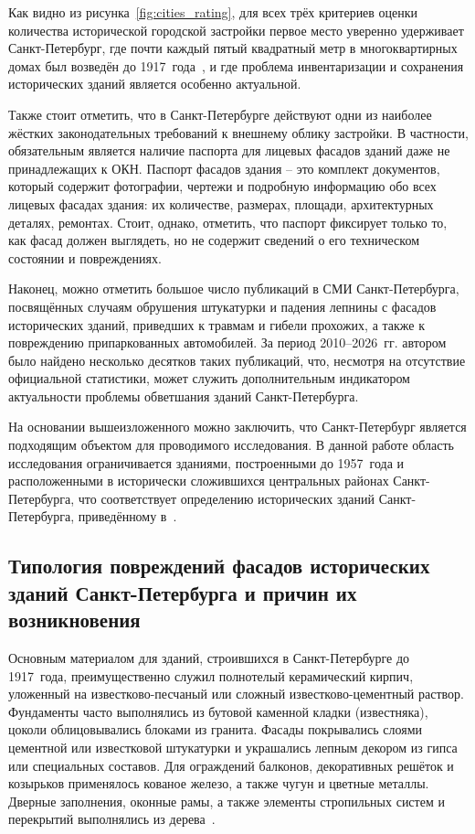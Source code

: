 \documentclass[14pt]{extarticle}
\begin{document}
Как видно из рисунка~\ref{fig:cities_rating}, для всех трёх критериев оценки
количества исторической городской застройки первое место уверенно удерживает
Санкт-Петербург, где почти каждый пятый квадратный метр в многоквартирных домах
был возведён до 1917~года~\cite{kontikimaps}, и где проблема инвентаризации и
сохранения исторических зданий является особенно актуальной.

Также стоит отметить, что в Санкт-Петербурге действуют одни из наиболее жёстких
законодательных требований к внешнему облику застройки. В
частности, обязательным является наличие паспорта для лицевых фасадов зданий
даже не принадлежащих к ОКН. Паспорт фасадов здания -- это комплект документов,
который содержит фотографии, чертежи и подробную информацию
обо всех лицевых фасадах здания: их количестве, размерах, площади,
архитектурных деталях, ремонтах. Стоит, однако, отметить, что паспорт фиксирует
только то, как фасад должен выглядеть, но не содержит сведений о его техническом
состоянии и повреждениях.

Наконец, можно отметить большое число публикаций в СМИ Санкт-Петербурга,
посвящённых случаям обрушения штукатурки и падения лепнины с фасадов
исторических зданий, приведших к травмам и гибели прохожих, а также
к повреждению припаркованных автомобилей. За период 2010--2026~гг. автором
было найдено несколько десятков таких публикаций, что, несмотря на отсутствие
официальной статистики, может служить дополнительным индикатором актуальности
проблемы обветшания зданий Санкт-Петербурга.

На основании вышеизложенного можно заключить, что Санкт-Петербург является
подходящим объектом для проводимого исследования. В данной работе область
исследования ограничивается зданиями, построенными до 1957~года и
расположенными в исторически сложившихся центральных районах Санкт-Петербурга,
что соответствует определению исторических зданий Санкт-Петербурга,
приведённому в~\cite{spblaw820}.

\subsection{Типология повреждений фасадов исторических зданий %
            Санкт-Петербурга и причин их возникновения}
\label{subsec:damage_types}

Основным материалом для зданий, строившихся в Санкт-Петербурге до 1917~года,
преимущественно служил полнотелый керамический кирпич, уложенный на
известково-песчаный или сложный известково-цементный раствор. Фундаменты
часто выполнялись из бутовой каменной кладки (известняка), цоколи
облицовывались блоками из гранита. Фасады покрывались слоями цементной или
известковой штукатурки и украшались лепным декором из гипса или специальных
составов. Для ограждений балконов, декоративных решёток и козырьков применялось
кованое железо, а также чугун и цветные металлы. Дверные заполнения, оконные
рамы, а также элементы стропильных систем и перекрытий выполнялись
из дерева~\cite{chistyakov2014}.
\end{document}
